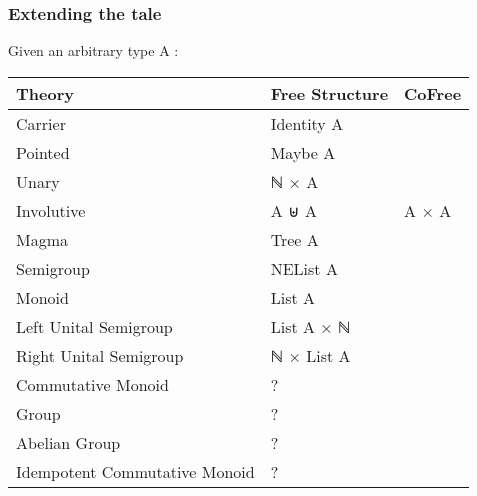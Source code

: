 \documentclass[serif,mathserif,professionalfont,10pt]{beamer}
\begin{document}
\begin{frame}
\frametitle{Extending the tale}
Given an arbitrary type A : \\ \vspace*{4mm}
\begin{tabular}{lll}
\textbf{Theory} & Free \textbf{Structure} & CoFree \\ \hline
Carrier & Identity A & \\
Pointed & Maybe A & \\ \hline
Unary & ℕ × A &  \\
Involutive & A ⊎ A & A × A \\ \hline
Magma & Tree A &  \\
Semigroup & NEList A & \\ \hline
Monoid & List A & \\
Left Unital Semigroup & List A × ℕ & \\
Right Unital Semigroup & ℕ × List A & \\ \hline
Commutative Monoid & ? & \\
Group & ? & \\
Abelian Group & ? & \\
Idempotent Commutative Monoid & ? & \\
\end{tabular}
\end{frame}
\end{document}
